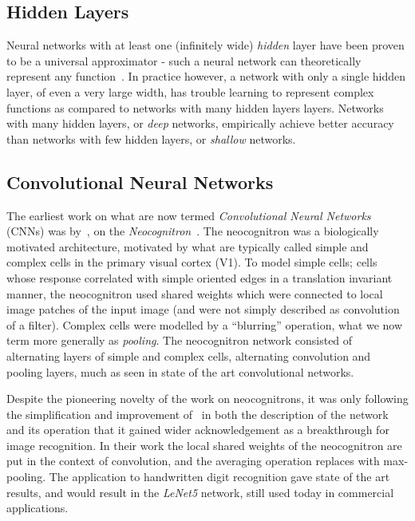 \documentclass[thesis]{subfiles}
\begin{document}
\subsection{Hidden Layers}
Neural networks with at least one (infinitely wide) \emph{hidden} layer have been proven to be a universal approximator - \ie such a neural network can theoretically represent any function~\citep{journals/mcss/Cybenko92,hornik89a}. In practice however, a network with only a single hidden layer, of even a very large width, has trouble learning to represent complex functions as compared to networks with many hidden layers layers. Networks with many hidden layers, or \emph{deep} networks, empirically achieve better accuracy than networks with few hidden layers, or \emph{shallow} networks.

\subsection{Convolutional Neural Networks}
The earliest work on what are now termed \emph{Convolutional Neural Networks} (CNNs) was by~\citet{Fuk80}, on the \emph{Neocognitron}~\citep{fukushima2013artificial}. The neocognitron was a biologically motivated architecture, motivated by what are typically called simple and complex cells in the primary visual cortex (V1). To model simple cells; cells whose response correlated with simple oriented edges in a translation invariant manner, the neocognitron used shared weights which were connected to local image patches of the input image (and were not simply described as convolution of a filter). Complex cells were modelled by a ``blurring'' operation, what we now term more generally as \emph{pooling}. The neocognitron network consisted of alternating layers of simple and complex cells, \ie alternating convolution and pooling layers, much as seen in state of the art convolutional networks.

Despite the pioneering novelty of the work on neocognitrons, it was only following the simplification and improvement of~\citet{Lecun1998} in both the description of the network and its operation that it gained wider acknowledgement as a breakthrough for image recognition. In their work the local shared weights of the neocognitron are put in the context of convolution, and the averaging operation replaces with max-pooling. The application to handwritten digit recognition gave state of the art results, and would result in the \emph{LeNet5} network, still used today in commercial applications.
\end{document}
